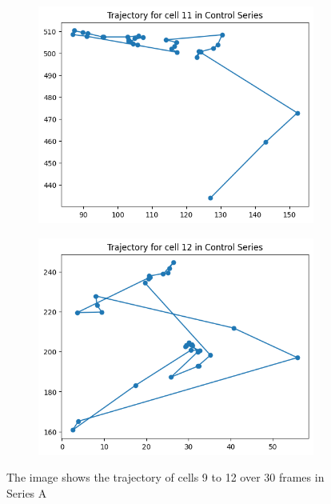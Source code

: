 \documentclass{article}
\begin{document}
\begin{figure}[h!]
\begin{subfigure}[b]{0.5\linewidth}
        \centering
        \includegraphics[width=\linewidth]{Report/Appendix_Images/Trajectory-A-Control/trajectory_11.png}
    \end{subfigure}%
    \begin{subfigure}[b]{0.5\linewidth}
        \centering
        \includegraphics[width=\linewidth]{Report/Appendix_Images/Trajectory-A-Control/trajectory_12.png}
    \end{subfigure}
    \caption{The image shows the trajectory of cells 9 to 12 over 30 frames in Series A}
    \label{fig:Trajectory-ControlSeries-9-12}
\end{figure}
\end{document}
